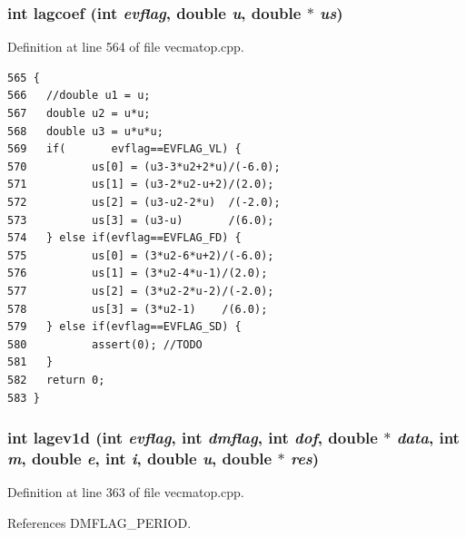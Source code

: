 \subsubsection{\setlength{\rightskip}{0pt plus 5cm}int lagcoef (int {\em evflag}, double {\em u}, double $\ast$ {\em us})}\label{vecmatop_8cpp_ae45c5a2ae5bb64731d2e859f5ca0586_ae45c5a2ae5bb64731d2e859f5ca0586}




Definition at line 564 of file vecmatop.cpp.

\footnotesize\begin{verbatim}565 {
566   //double u1 = u;
567   double u2 = u*u;
568   double u3 = u*u*u;
569   if(       evflag==EVFLAG_VL) {
570          us[0] = (u3-3*u2+2*u)/(-6.0);
571          us[1] = (u3-2*u2-u+2)/(2.0);
572          us[2] = (u3-u2-2*u)  /(-2.0);
573          us[3] = (u3-u)       /(6.0);
574   } else if(evflag==EVFLAG_FD) {
575          us[0] = (3*u2-6*u+2)/(-6.0);
576          us[1] = (3*u2-4*u-1)/(2.0);
577          us[2] = (3*u2-2*u-2)/(-2.0);
578          us[3] = (3*u2-1)    /(6.0);
579   } else if(evflag==EVFLAG_SD) {
580          assert(0); //TODO
581   }
582   return 0;
583 }
\end{verbatim}\normalsize 


\subsubsection{\setlength{\rightskip}{0pt plus 5cm}int lagev1d (int {\em evflag}, int {\em dmflag}, int {\em dof}, double $\ast$ {\em data}, int {\em m}, double {\em e}, int {\em i}, double {\em u}, double $\ast$ {\em res})}\label{vecmatop_8cpp_c8debec910081580c1916b04a8252037_c8debec910081580c1916b04a8252037}




Definition at line 363 of file vecmatop.cpp.

References DMFLAG\_\-PERIOD.

